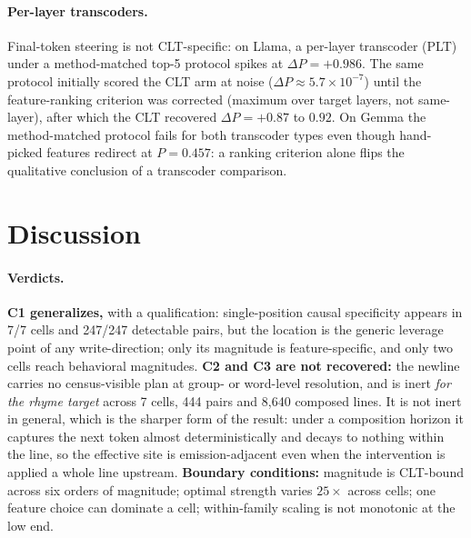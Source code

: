 \documentclass[11pt]{article}
\begin{document}
\paragraph{Per-layer transcoders.}
Final-token steering is not CLT-specific: on Llama, a per-layer transcoder (PLT) under a method-matched top-5 protocol spikes at $\Delta P=+0.986$. The same protocol initially scored the CLT arm at noise ($\Delta P\approx5.7\times10^{-7}$) until the feature-ranking criterion was corrected (maximum over target layers, not same-layer), after which the CLT recovered $\Delta P=+0.87$ to $0.92$. On Gemma the method-matched protocol fails for both transcoder types even though hand-picked features redirect at $P=0.457$: a ranking criterion alone flips the qualitative conclusion of a transcoder comparison.

\section{Discussion}
\label{sec:discussion}

\paragraph{Verdicts.}
\textbf{C1 generalizes,} with a qualification: single-position causal specificity appears in 7/7 cells and 247/247 detectable pairs, but the location is the generic leverage point of any write-direction; only its magnitude is feature-specific, and only two cells reach behavioral magnitudes. \textbf{C2 and C3 are not recovered:} the newline carries no census-visible plan at group- or word-level resolution, and is inert \emph{for the rhyme target} across 7 cells, 444 pairs and 8{,}640 composed lines. It is not inert in general, which is the sharper form of the result: under a composition horizon it captures the next token almost deterministically and decays to nothing within the line, so the effective site is emission-adjacent even when the intervention is applied a whole line upstream. \textbf{Boundary conditions:} magnitude is CLT-bound across six orders of magnitude; optimal strength varies $25\times$ across cells; one feature choice can dominate a cell; within-family scaling is not monotonic at the low end.
\end{document}
